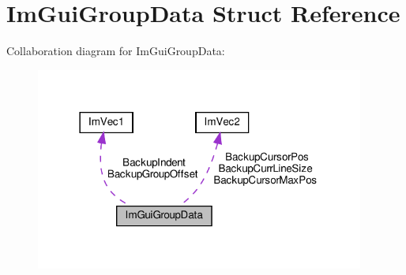 \hypertarget{structImGuiGroupData}{}\section{Im\+Gui\+Group\+Data Struct Reference}
\label{structImGuiGroupData}


Collaboration diagram for Im\+Gui\+Group\+Data\+:\nopagebreak
\begin{figure}[H]
\begin{center}
\leavevmode
\includegraphics[width=306pt]{structImGuiGroupData__coll__graph}
\end{center}
\end{figure}
